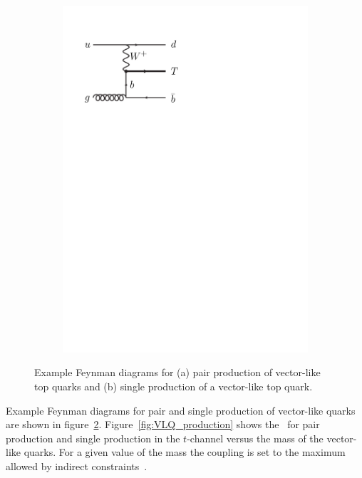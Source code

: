 \begin{figure}[tb!]
\begin{subfigure}{0.35\textwidth}
    \includegraphics[width=\textwidth]{Theory/FeynmanGraphs/T_singleProd_good.pdf}
  \caption{}
  \label{fig:T_singleProd}
\end{subfigure}
\caption{Example Feynman diagrams for (a) pair production of vector-like top quarks and (b) single production of a vector-like top quark.}
  \label{fig:T_Prod}
\end{figure}

Example Feynman diagrams for pair and single production of vector-like quarks are shown in figure~\ref{fig:T_Prod}.
Figure~\ref{fig:VLQ_production} shows the \xsec\ for pair production and single production in the $t$-channel versus the mass of the vector-like quarks. For a given value of the mass the coupling is set to the maximum allowed by indirect constraints~\cite{Aguilar-Saavedra:2013qpa}.

